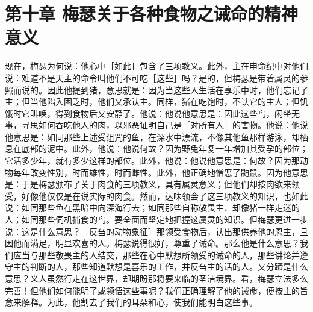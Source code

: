 
\section{第十章 梅瑟关于各种食物之诫命的精神意义}

现在，梅瑟为何说：他心中［如此］包含了三项教义。此外，主在申命纪中对他们说：难道不是天主的命令叫他们不可吃［这些］吗？是的，但梅瑟是带着属灵的参照而说的。因此他提到猪，意思就是：因为当这些人生活在享乐中时，他们忘记了主；但当他陷入困乏时，他们又承认主。同样，猪在吃饱时，不认它的主人；但饥饿时它叫唤，得到食物后又安静了。他说：他说他意思是：因此这些鸟，闲坐无事，寻思如何吞吃他人的肉，以邪恶证明自己是［对所有人］的害物。他说：他说他意思是：如同那些上述受诅咒的鱼，在深水中漂流，不像其他鱼那样游泳，却栖息在底部的泥中。此外，他说：他说何故？因为野兔年复一年增加其受孕的部位；它活多少年，就有多少这样的部位。此外，他说：他说他意思是：何故？因为那动物每年改变性别，时而雄性，时而雌性。此外，他正确地憎恶了鼬鼠。因为他意思是：于是梅瑟颁布了关于肉食的三项教义，具有属灵意义；但他们却按肉欲来领受，好像他仅仅是在说实际的肉食。然而，达味领会了这三项教义的知识，也如此说：如同那些鱼在黑暗中向深海行去；如同那些自称敬畏主、却像猪一样走迷的人；如同那些伺机捕食的鸟。要全面而坚定地把握这属灵的知识。但梅瑟更进一步说：这是什么意思？［反刍的动物象征］那领受食物后，认出那供养他的恩主，且因他而满足，明显欢喜的人。梅瑟说得很好，尊重了诫命。那么他是什么意思？我们应当与那些敬畏主的人结交，那些在心中默想所领受的诫命的人，那些讲论并遵守主的判断的人，那些知道默想是喜乐的工作，并反刍主的话的人。又分蹄是什么意思？义人虽然行走在这世界，却期盼那将要来临的圣洁境界。看，梅瑟立法多么完善！但他们如何能明了或领悟这些事呢？我们正确理解了他的诫命，便按主的旨意来解释。为此，他割去了我们的耳朵和心，使我们能明白这些事。\par

